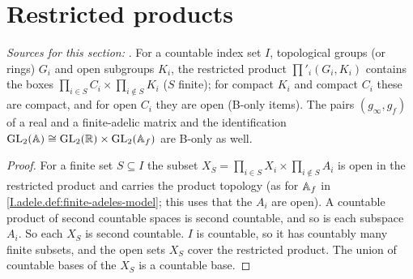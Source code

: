 \section{Restricted products}\label{sec:haar-adelic}

\noindent\emph{Sources for this section:} \cite[§3.3]{Corv-ptIII-1}. For a countable index set $I$, topological groups (or rings) $G_i$ and
open subgroups $K_i$, the restricted product $\prod'_i(G_i,K_i)$ contains the boxes $\prod_{i\in S}C_i\times\prod_{i\notin S}K_i$
($S$ finite); for compact $K_i$ and compact $C_i$ these are compact, and for open $C_i$ they are open (B-only items). The pairs
$(g_\infty,g_f)$ of a real and a finite-adelic matrix and the identification $\mathrm{GL}_2(\mathbb{A})\cong\mathrm{GL}_2(\mathbb{R})\times\mathrm{GL}_2(\mathbb{A}_f)$ are B-only as well.

\begin{theorem}
\end{theorem}
\begin{proof}
For a finite set $S\subseteq I$ the subset $X_S=\prod_{i\in S}X_i\times\prod_{i\notin S}A_i$ is open in the restricted
product and carries the product topology (as for $\mathbb{A}_f$ in \cref{I.adele.def:finite-adeles-model}; this uses that the
$A_i$ are open). A countable product of second countable spaces is second countable, and so is each subspace $A_i$. So
each $X_S$ is second countable. $I$ is countable, so it has countably many finite subsets, and the open sets $X_S$ cover
the restricted product. The union of countable bases of the $X_S$ is a countable base.
\end{proof}
